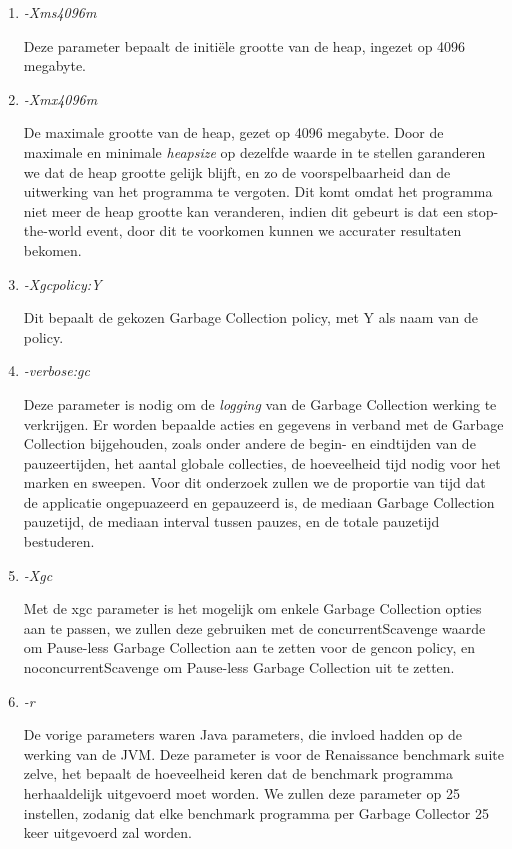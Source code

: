 \begin{enumerate}
    
    \item \textit{-Xms4096m}
    
    Deze parameter bepaalt de initiële grootte van de heap, ingezet op 4096 megabyte.
    
    
    \item \textit{-Xmx4096m}
    
    De maximale grootte van de heap, gezet op 4096 megabyte.
    Door de maximale en minimale \textit{heapsize} op dezelfde waarde in te stellen garanderen we dat de heap grootte gelijk blijft, en zo de voorspelbaarheid dan de uitwerking van het programma te vergoten.
    Dit komt omdat het programma niet meer de heap grootte kan veranderen, indien dit gebeurt is dat een stop-the-world event, door dit te voorkomen kunnen we accurater resultaten bekomen.
   

    \item \textit{-Xgcpolicy:Y}
    
    Dit bepaalt de gekozen Garbage Collection policy, met Y als naam van de policy.
    
    \item \textit{-verbose:gc}
    
    Deze parameter is nodig om de \textit{logging} van de Garbage Collection werking te verkrijgen.
    Er worden bepaalde acties en gegevens in verband met de Garbage Collection bijgehouden, zoals onder andere de begin- en eindtijden van de pauzeertijden, het aantal globale collecties, de hoeveelheid tijd nodig voor het marken en sweepen.
    Voor dit onderzoek zullen we de proportie van tijd dat de applicatie ongepuazeerd en gepauzeerd is, de mediaan  Garbage Collection pauzetijd, de mediaan interval tussen pauzes, en de totale pauzetijd bestuderen.
    
    
    \item \textit{-Xgc}
    
    Met de xgc parameter is het mogelijk om enkele Garbage Collection opties aan te passen, we zullen deze gebruiken met de concurrentScavenge waarde om Pause-less Garbage Collection aan te zetten voor de gencon policy, en noconcurrentScavenge om Pause-less Garbage Collection uit te zetten.
    
    
    
    \item \textit{-r}
    
    De vorige parameters waren Java parameters, die invloed hadden op de werking van de JVM.
    Deze parameter is voor de Renaissance benchmark suite zelve, het bepaalt de hoeveelheid keren dat de benchmark programma herhaaldelijk uitgevoerd moet worden.
    We zullen deze parameter op 25 instellen, zodanig dat elke benchmark programma per Garbage Collector 25 keer uitgevoerd zal worden.
    
\end{enumerate}



